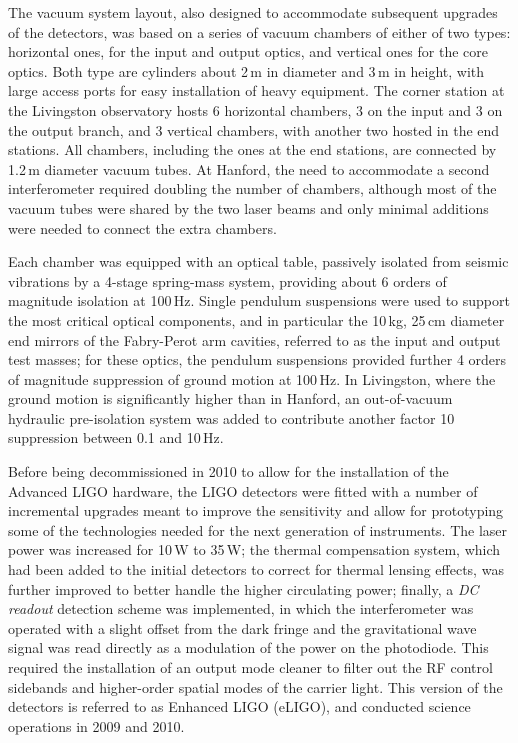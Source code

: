The vacuum system layout, also designed to accommodate subsequent upgrades of the detectors, was based on a series of vacuum chambers of either of two types: horizontal ones, for the input and output optics, and vertical ones for the core optics.
Both type are cylinders about 2\,m in diameter and 3\,m in height, with large access ports for easy installation of heavy equipment.
The corner station at the Livingston observatory hosts 6 horizontal chambers, 3 on the input and 3  on the output branch, and 3 vertical chambers, with another two hosted in the end stations.
All chambers, including the ones at the end stations, are connected by 1.2\,m diameter vacuum tubes.
At Hanford, the need to accommodate a second interferometer required doubling the number of chambers, although most of the vacuum tubes were shared by the two laser beams and only minimal additions were needed to connect the extra chambers.

Each chamber was equipped with an optical table, passively isolated from seismic vibrations by a 4-stage spring-mass system, providing about 6 orders of magnitude isolation at 100\,Hz\cite{Giaime_1996}.
Single pendulum suspensions were used to support the most critical optical components, and in particular the 10\,kg, 25\,cm diameter end mirrors of the Fabry-Perot arm cavities, referred to as the input and output test masses; for these optics, the pendulum suspensions provided further 4 orders of magnitude suppression of ground motion at 100\,Hz.
In Livingston, where the ground motion is significantly higher than in Hanford, an out-of-vacuum hydraulic pre-isolation system was added to contribute another factor 10 suppression between 0.1 and 10\,Hz.

Before being decommissioned in 2010 to allow for the installation of the Advanced LIGO hardware, the LIGO detectors were fitted with a number of incremental upgrades\cite{Aasi_2015} meant to improve the sensitivity and allow for prototyping some of the technologies needed for the next generation of instruments.
The laser power was increased for 10\,W to 35\,W;
the thermal compensation system, which had been added to the initial detectors to correct for thermal lensing effects, was further improved to better handle the higher circulating power;
finally, a \textit{DC readout} detection scheme was implemented, in which the interferometer was operated with a slight offset from the dark fringe and the gravitational wave signal was read directly as a modulation of the power on the photodiode.
This required the installation of an output mode cleaner to filter out the RF control sidebands and higher-order spatial modes of the carrier light.
This version of the detectors is referred to as Enhanced LIGO (eLIGO), and conducted science operations in 2009 and 2010. 

